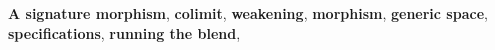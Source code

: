 
{\bf A signature morphism}, {\bf colimit}, {\bf weakening}, {\bf
morphism}, {\bf generic space}, {\bf specifications}, {\bf running the
blend},





